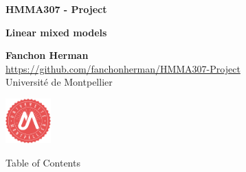\documentclass[unknownkeysallowed]{beamer}
\begin{document}



\begin{frame}
\bigskip
\bigskip
\begin{center}{
\LARGE\color{marron}
\textbf{HMMA307 - Project}
\textbf{ }\\
\vspace{0.5cm}
}

\color{marron}
\textbf{Linear mixed models}
\end{center}

\vspace{0.5cm}

\begin{center}
\textbf{Fanchon Herman} \\
\vspace{0.1cm}
\url{https://github.com/fanchonherman/HMMA307-Project}\\
\vspace{0.5cm}
Université de Montpellier \\
\end{center}

\centering
\includegraphics[width=0.13\textwidth]{./images/Logo}

\end{frame}





\begin{frame}{Table of Contents}
\tableofcontents[hideallsubsections]
\end{frame}
\end{document}
